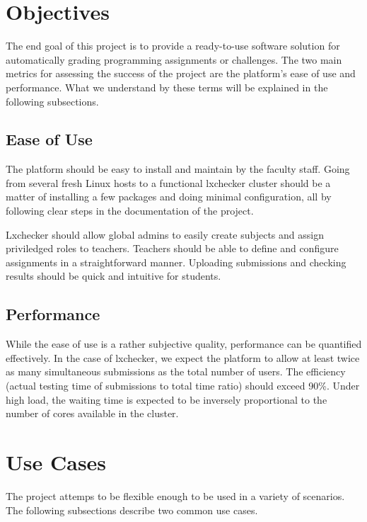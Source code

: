 \section{Objectives}
\label{sec:objectives}

The end goal of this project is to provide a ready-to-use software solution for automatically grading programming assignments or challenges. The two main metrics for assessing the success of the project are the platform's ease of use and performance. What we understand by these terms will be explained in the following subsections.

\subsection{Ease of Use}
\label{sub-sec:ease-of-use}

The platform should be easy to install and maintain by the faculty staff. Going from several fresh Linux hosts to a functional lxchecker cluster should be a matter of installing a few packages and doing minimal configuration, all by following clear steps in the documentation of the project.

Lxchecker should allow global admins to easily create subjects and assign priviledged roles to teachers. Teachers should be able to define and configure assignments in a straightforward manner. Uploading submissions and checking results should be quick and intuitive for students.

\subsection{Performance}
\label{sub-sec:performance}

While the ease of use is a rather subjective quality, performance can be quantified effectively. In the case of lxchecker, we expect the platform to allow at least twice as many simultaneous submissions as the total number of users. The efficiency (actual testing time of submissions to total time ratio) should exceed 90\%. Under high load, the waiting time is expected to be inversely proportional to the number of cores available in the cluster.


\section{Use Cases}
\label{sec:use-cases}

The project attemps to be flexible enough to be used in a variety of scenarios. The following subsections describe two common use cases.

